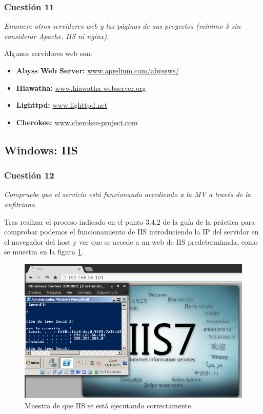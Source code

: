 \subsubsection{Cuestión 11}
\textit{Enumere otros servidores web y las páginas de sus proyectos (mínimo 3 sin considerar Apache, IIS ni nginx).}
\newline

Algunos servidores web son:
\begin{itemize}
  \item \textbf{Abyss Web Server: } \url{www.aprelium.com/abyssws/}
  \item \textbf{Hiawatha: } \url{www.hiawatha-webserver.org}
  \item \textbf{Lighttpd: } \url{www.lighttpd.net}
  \item \textbf{Cherokee: } \url{www.cherokee-project.com}
\end{itemize}






\subsection{Windows: IIS}
\subsubsection{Cuestión 12}
\textit{Compruebe que el servicio está funcionando accediendo a la MV a través de la anfitriona.}
\newline

Tras realizar el proceso indicado en el punto 3.4.2 de la guía de la práctica para comprobar podemos  el funcionamiento de IIS introduciendo la IP del servidor en el navegador del host y ver que se accede a un web de IIS predeterminada, como se muestra en la figura \ref{fig20}.

\begin{figure}[H]
    \begin{center}
        \includegraphics[scale=0.5]{imagenes/img20}
        \caption{Muestra de que IIS se está ejecutando correctamente.}
        \label{fig20}
    \end{center}
\end{figure}

